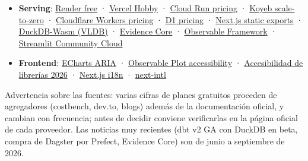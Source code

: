 \begin{itemize}
\item \textbf{Serving}: \href{https://render.com/docs/free}{Render free} · \href{https://vercel.com/docs/plans/hobby}{Vercel Hobby} · \href{https://cloud.google.com/run/pricing}{Cloud Run pricing} · \href{https://www.koyeb.com/docs/run-and-scale/scale-to-zero}{Koyeb scale-to-zero} · \href{https://developers.cloudflare.com/workers/platform/pricing/}{Cloudflare Workers pricing} · \href{https://developers.cloudflare.com/d1/platform/pricing/}{D1 pricing} · \href{https://nextjs.org/docs/app/guides/static-exports}{Next.js static exports} · \href{https://www.vldb.org/pvldb/vol15/p3574-kohn.pdf}{DuckDB-Wasm (VLDB)} · \href{https://evidence.dev/blog/evidence-core}{Evidence Core} · \href{https://observablehq.com/framework/data-loaders}{Observable Framework} · \href{https://docs.streamlit.io/deploy/streamlit-community-cloud/manage-your-app}{Streamlit Community Cloud}
\item \textbf{Frontend}: \href{https://echarts.apache.org/handbook/en/best-practices/aria/}{ECharts ARIA} · \href{https://observablehq.com/plot/features/accessibility}{Observable Plot accessibility} · \href{https://www.disabilityworld.org/articles/accessible-data-viz-tooling-2026/}{Accesibilidad de librerías 2026} · \href{https://nextjs.org/docs/app/guides/internationalization}{Next.js i18n} · \href{https://next-intl.dev/docs/getting-started/app-router}{next-intl}
\end{itemize}

\begin{nota}
Advertencia sobre las fuentes: varias cifras de planes gratuitos proceden de agregadores (costbench, dev.to, blogs) además de la documentación oficial, y cambian con frecuencia; antes de decidir conviene verificarlas en la página oficial de cada proveedor. Las noticias muy recientes (dbt v2 GA con DuckDB en beta, compra de Dagster por Prefect, Evidence Core) son de junio a septiembre de 2026.
\end{nota}

